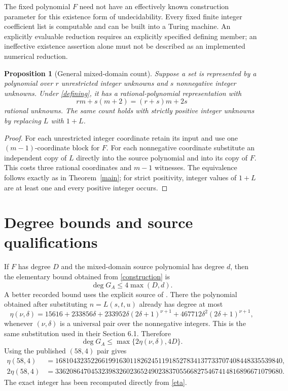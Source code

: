 \documentclass[11pt,a4paper]{article}
\newtheorem{proposition}[theorem]{Proposition}
\begin{document}
The fixed polynomial $F$ need not have an effectively known construction
parameter for this existence form of undecidability. Every fixed finite
integer coefficient list is computable and can be built into a Turing machine.
An explicitly evaluable reduction requires an explicitly specified defining
member; an ineffective existence assertion alone must not be described as an
implemented numerical reduction.

\begin{proposition}[General mixed-domain count]\label{mixed}
Suppose a set is represented by a polynomial over $r$ unrestricted integer
unknowns and $s$ nonnegative integer unknowns. Under \eqref{defining}, it has a
rational-polynomial representation with
\[
 rm+s(m+2)=(r+s)m+2s
\]
rational unknowns. The same count holds with strictly positive integer unknowns
by replacing $L$ with $1+L$.
\end{proposition}
\begin{proof}
For each unrestricted integer coordinate retain its input and use one
$(m-1)$-coordinate block for $F$. For each nonnegative coordinate substitute
an independent copy of $L$ directly into the source polynomial and into
its copy of $F$. This costs three rational coordinates and $m-1$ witnesses.
The equivalence follows exactly as in Theorem~\ref{main}; for strict positivity,
integer values of $1+L$ are at least one and every positive integer occurs.
\end{proof}

\section{Degree bounds and source qualifications}
If $F$ has degree $D$ and the mixed-domain source polynomial has degree $d$,
then the elementary bound obtained from \eqref{construction} is
\[
 \deg G_A\le4\max(D,d).
\]
A better recorded bound uses the explicit source of \cite{BDHMS}. There the
polynomial obtained after substituting $n=L(s,t,u)$ already has degree at most
\begin{equation}\label{eta}
 \eta(\nu,\delta)=15616+233856\delta
   +233952\delta(2\delta+1)^{\nu+1}
   +467712\delta^2(2\delta+1)^{\nu+1},
\end{equation}
whenever $(\nu,\delta)$ is a universal pair over the nonnegative integers.
This is the same substitution used in their Section 6.1. Therefore
\begin{equation}\label{degree}
 \deg G_A\le\max\{2\eta(\nu,\delta),4D\}.
\end{equation}
Using the published $(58,4)$ pair gives
\begin{align*}
 \eta(58,4)
 &=1681043235226619916301182624511918527834137733707408448335539840,\\
 2\eta(58,4)
 &=3362086470453239832602365249023837055668275467414816896671079680.
\end{align*}
The exact integer has been recomputed directly from \eqref{eta}.
\end{document}
